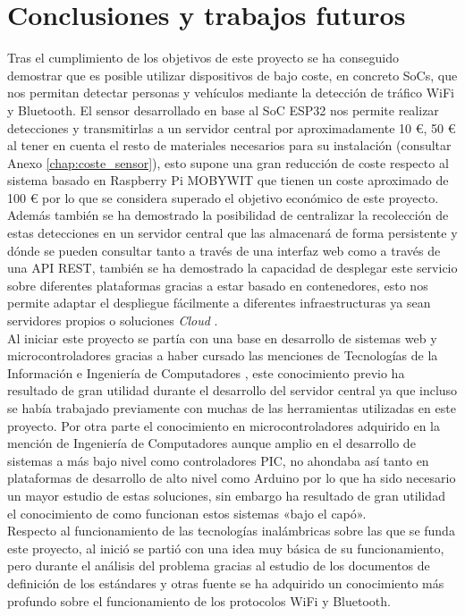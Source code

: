 \documentclass[../proyecto.tex]{subfiles}
\begin{document}
\chapter{Conclusiones y trabajos futuros}\label{chap:conclusiones}

Tras el cumplimiento de los objetivos de este proyecto se ha conseguido demostrar que es posible utilizar dispositivos de bajo coste, en concreto SoCs, que nos permitan detectar personas y vehículos mediante la detección de tráfico WiFi y Bluetooth. El sensor desarrollado en base al SoC ESP32 nos permite realizar detecciones y transmitirlas a un servidor central por aproximadamente 10 €, 50 € al tener en cuenta el resto de materiales necesarios para su instalación (consultar Anexo \ref{chap:coste_sensor}), esto supone una gran reducción de coste respecto al sistema basado en Raspberry Pi MOBYWIT que tienen un coste aproximado de 100 € por lo que se considera superado el objetivo económico de este proyecto. Además también se ha demostrado la posibilidad de centralizar la recolección de estas detecciones en un servidor central que las almacenará de forma persistente y dónde se pueden consultar tanto a través de una interfaz web como a través de una API REST, también se ha demostrado la capacidad de desplegar este servicio sobre diferentes plataformas gracias a estar basado en contenedores, esto nos permite adaptar el despliegue fácilmente a diferentes infraestructuras ya sean servidores propios o soluciones \textit{Cloud} .\\

Al iniciar este proyecto se partía con una base en desarrollo de sistemas web y microcontroladores gracias a haber cursado las menciones de Tecnologías de la Información e Ingeniería de Computadores , este conocimiento previo ha resultado de gran utilidad durante el desarrollo del servidor central ya que incluso se había trabajado previamente con muchas de las herramientas utilizadas en este proyecto. Por otra parte el conocimiento en microcontroladores adquirido en la mención de Ingeniería de Computadores aunque amplio en el desarrollo de sistemas a más bajo nivel como controladores PIC,  no ahondaba así tanto en plataformas de desarrollo de alto nivel como Arduino por lo que ha sido necesario un mayor estudio de estas soluciones, sin embargo ha resultado de gran utilidad el conocimiento de como funcionan estos sistemas «bajo el capó». \\

Respecto al funcionamiento de las tecnologías inalámbricas sobre las que se funda este proyecto, al inició se partió con una idea muy básica de su funcionamiento, pero durante el análisis del problema gracias al estudio de los documentos de definición de los estándares y otras fuente se ha adquirido un conocimiento más profundo sobre el funcionamiento de los protocolos WiFi y Bluetooth.\\
\end{document}
